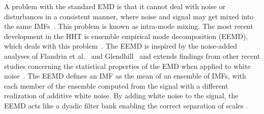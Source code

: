 \documentclass[a4paper]{IEEEtran}
\begin{document}
A problem with the standard EMD is that it cannot deal with noise or disturbances in a consistent manner, where noise and signal may get mixed into the same IMFs~\cite{Wu2009}. This problem is known as intra-mode mixing. The most recent development in the HHT is ensemble empirical mode decomposition (EEMD), which deals with this problem~\cite{Wu2009}. The EEMD is inspired by the noise-added analyses of Flandrin et al.~\cite{Flandrin2005} and Glendhill~\cite{Gledhill2003} and extends findings from other recent studies concerning the statistical properties of the EMD when applied to white noise~\cite{Flandrin2004,Wu2004}. The EEMD defines an IMF as the mean of an ensemble of IMFs, with each member of the ensemble computed from the signal with a different realization of additive white noise. By adding white noise to the signal, the EEMD acts like a dyadic filter bank enabling the correct separation of scales \cite{Flandrin2005a}.
\end{document}
